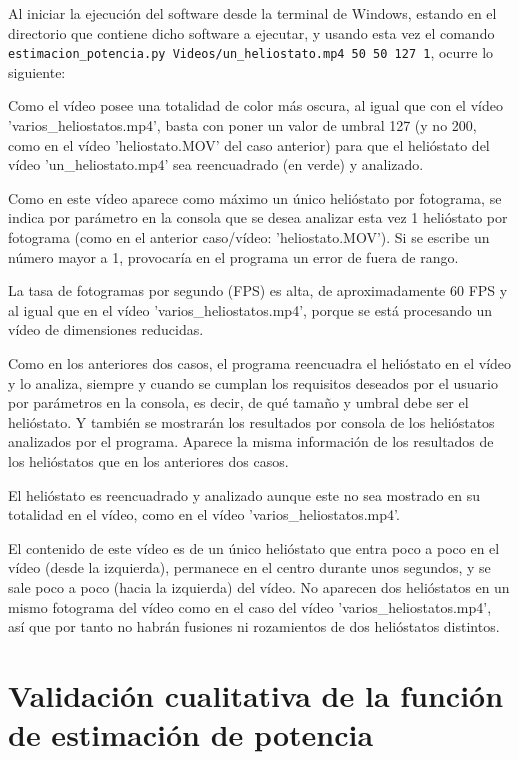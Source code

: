 Al iniciar la ejecución del software desde la terminal de Windows, estando en el directorio que contiene dicho software a ejecutar, y usando esta vez el comando\\ \verb|estimacion_potencia.py Videos/un_heliostato.mp4 50 50 127 1|, ocurre lo siguiente:

Como el vídeo posee una totalidad de color más oscura, al igual que con el vídeo 'varios\_heliostatos.mp4', basta con poner un valor de umbral 127 (y no 200, como en el vídeo 'heliostato.MOV' del caso anterior) para que el helióstato del vídeo 'un\_heliostato.mp4' sea reencuadrado (en verde) y analizado.

Como en este vídeo aparece como máximo un único helióstato por fotograma, se indica por parámetro en la consola que se desea analizar esta vez 1 helióstato por fotograma (como en el anterior caso/vídeo: 'heliostato.MOV'). Si se escribe un número mayor a 1, provocaría en el programa un error de fuera de rango.

La tasa de fotogramas por segundo (FPS) es alta, de aproximadamente 60 FPS y al igual que en el vídeo 'varios\_heliostatos.mp4', porque se está procesando un vídeo de dimensiones reducidas.

Como en los anteriores dos casos, el programa reencuadra el helióstato en el vídeo y lo analiza, siempre y cuando se cumplan los requisitos deseados por el usuario por parámetros en la consola, es decir, de qué tamaño y umbral debe ser el helióstato. Y también se mostrarán los resultados por consola de los helióstatos analizados por el programa. Aparece la misma información de los resultados de los helióstatos que en los anteriores dos casos.

El helióstato es reencuadrado y analizado aunque este no sea mostrado en su totalidad en el vídeo, como en el vídeo 'varios\_heliostatos.mp4'.

El contenido de este vídeo es de un único helióstato que entra poco a poco en el vídeo (desde la izquierda), permanece en el centro durante unos segundos, y se sale poco a poco (hacia la izquierda) del vídeo. No aparecen dos helióstatos en un mismo fotograma del vídeo como en el caso del vídeo 'varios\_heliostatos.mp4', así que por tanto no habrán fusiones ni rozamientos de dos helióstatos distintos.

\section{Validación cualitativa de la función de estimación de potencia}

